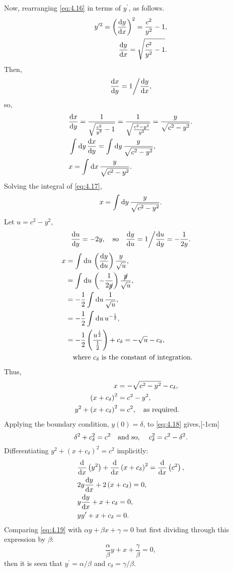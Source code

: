 Now, rearranging \eqref{eq:4.16} in terms of $y^\prime$, as follows.
\begin{equation*}
\begin{split}
	y^{\prime2}=\left(\frac{\mathrm{d}y}{\mathrm{d}x}\right)^2 = \frac{c^2}{y^2} - 1,\\
	\frac{\mathrm{d}y}{\mathrm{d}x} = \sqrt{\frac{c^2}{y^2} - 1}.\\
\end{split}
\end{equation*}
Then,
\[
	\frac{\mathrm{d}x}{\mathrm{d}y} = 1\bigg/\frac{\mathrm{d}y}{\mathrm{d}x},
\]
so,
\begin{align}
	\label{eq:4.17}
	&\frac{\mathrm{d}x}{\mathrm{d}y} = \frac{1}{\sqrt{\frac{c^2}{y^2} - 1}} = \frac{1}{\sqrt{\frac{c^2-y^2}{y^2}}} = \frac{y}{\sqrt{c^2-y^2}}\nonumber.\\
	&\int_{}^{}\mathrm{d} y\,\frac{\mathrm{d}x}{\mathrm{d}y} = \int_{}^{}\mathrm{d} y\, \frac{y}{\sqrt{c^2-y^2}},\nonumber\\
	&x=\int_{}^{}\mathrm{d} x\, \frac{y}{\sqrt{c^2-y^2}}.
\end{align}
Solving the integral of \eqref{eq:4.17},
\[
	x = \int_{}^{}\mathrm{d} y\, \frac{y}{\sqrt{c^2-y^2}}.
\]
Let $u=c^2 - y^2$,
\[
	\frac{\mathrm{d}u}{\mathrm{d}y} = -2y,\quad\text{so}\quad \frac{\mathrm{d}y}{\mathrm{d}u} = 1\bigg/ \frac{\mathrm{d}u}{\mathrm{d}y} = -\frac{1}{2y}.
\]
\begin{align*}
x &= \int_{}^{}\mathrm{d} u\,\left(\frac{\mathrm{d}y}{\mathrm{d}u}\right) \frac{y}{\sqrt{u}},\\
&= \int_{}^{}\mathrm{d} u\,\left(-\frac{1}{2\cancel{y}}\right) \frac{\cancel{y}}{\sqrt{u}},\\
&=-\frac{1}{2}\int_{}^{}\mathrm{d} u\,\frac{1}{\sqrt{u}},\\
&= -\frac{1}{2}\int_{}^{}\mathrm{d} u\, u^{-\frac{1}{2}},\\
&=-\frac{1}{2}\left(\frac{u^{\frac{1}{2}}}{\frac{1}{2}}\right) + c_\delta = -\sqrt{u} - c_\delta,\\&\quad\text{where $c_\delta$ is the constant of integration.}\quad
\end{align*}
Thus, 
\begin{align}
\label{eq:4.18}
x &= -\sqrt{c^2-y^2} - c_\delta,\nonumber\\
\left(x + c_\delta\right)^2 &= c^2 - y^2,\nonumber\\
y^2 + \left(x + c_\delta\right)^2 &= c^2, \quad\text{as required.}\quad
\end{align}
Applying the boundary condition, $y(0) = \delta$, to \eqref{eq:4.18} gives,[-1cm]
\[
	\delta^2 + c^2_\delta = c^2\quad\text{and so, }\quad c^2_\delta = c^2 - \delta^2.
\]
Differentiating $y^2 + (x + c_\delta)^2 = c^2$ implicitly:
\begin{align}
\label{eq:4.19}
&\frac{\mathrm{d}}{\mathrm{d}x}\left(y^2\right) + \frac{\mathrm{d}}{\mathrm{d}x}\left(x + c_\delta\right)^2 = \frac{\mathrm{d}}{\mathrm{d}x}\left(c^2\right),\nonumber\\
&2y\frac{\mathrm{d}y}{\mathrm{d}x} + 2\left(x + c_\delta\right) = 0,\nonumber\\
&y\frac{\mathrm{d}y}{\mathrm{d}x} + x + c_\delta = 0,\nonumber\\
&yy^\prime + x + c_\delta = 0.
\end{align}
Comparing \eqref{eq:4.19} with $\alpha y + \beta x + \gamma=0$ but first dividing through this expression by $\beta$:
\[
	\frac{\alpha}{\beta} y + x + \frac{\gamma}{\beta} = 0,
\]
then it is seen that $y^\prime = \alpha / \beta$ and $c_\delta = \gamma / \beta$.

